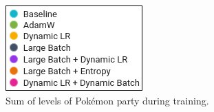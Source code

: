 \documentclass[10pt,conference]{IEEEtran}
\begin{document}
\begin{figure}[htbp]
  \centering
  \begin{minipage}[b]{\textwidth}
    \centering
  \end{minipage}
  \hfill
  \begin{minipage}[b]{\textwidth}
    \centering
    \includegraphics{figs/legend.png}
    \caption{Sum of levels of Pokémon party during training.}
    \label{fig:healr}
  \end{minipage}
\end{figure}
\end{document}
